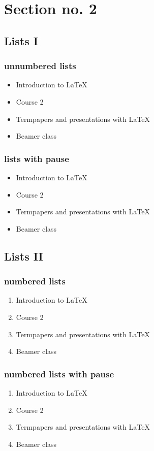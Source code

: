 \documentclass{beamer}
\begin{document}
\section{Section no. 2} 
\subsection{Lists I}
\begin{frame}\frametitle{unnumbered lists}
\begin{itemize}
\item Introduction to  \LaTeX  
\item Course 2 
\item Termpapers and presentations with \LaTeX 
\item Beamer class
\end{itemize} 
\end{frame}

\begin{frame}\frametitle{lists with pause}
\begin{itemize}
\item Introduction to  \LaTeX \pause 
\item Course 2 \pause 
\item Termpapers and presentations with \LaTeX \pause 
\item Beamer class
\end{itemize} 
\end{frame}

\subsection{Lists II}
\begin{frame}\frametitle{numbered lists}
\begin{enumerate}
\item Introduction to  \LaTeX  
\item Course 2 
\item Termpapers and presentations with \LaTeX 
\item Beamer class
\end{enumerate}
\end{frame}


\begin{frame}\frametitle{numbered lists with pause}
\begin{enumerate}
\item Introduction to  \LaTeX \pause 
\item Course 2 \pause 
\item Termpapers and presentations with \LaTeX \pause 
\item Beamer class
\end{enumerate}
\end{frame}
\end{document}
